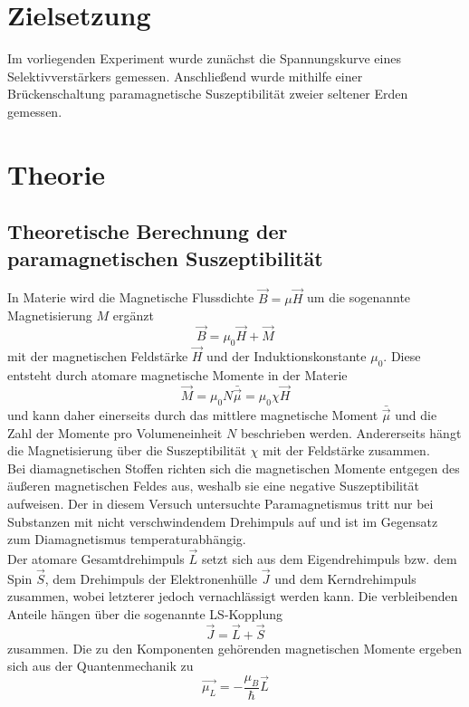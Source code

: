 \section{Zielsetzung}
Im vorliegenden Experiment wurde zunächst die Spannungskurve eines Selektivverstärkers gemessen. Anschließend wurde mithilfe einer Brückenschaltung paramagnetische Suszeptibilität zweier seltener Erden gemessen.
\section{Theorie}
\subsection{Theoretische Berechnung der paramagnetischen Suszeptibilität}
In Materie wird die Magnetische Flussdichte $\vec{B}=\mu \vec{H}$ um die sogenannte Magnetisierung $M$ ergänzt
\begin{equation*}
\vec{B}=\mu _0 \vec{H}+\vec{M}
\end{equation*}
mit der magnetischen Feldstärke $\vec{H}$ und der Induktionskonstante $\mu_0$. Diese entsteht durch atomare magnetische Momente in der Materie
\begin{equation}
\vec{M}=\mu_0N\bar{\vec{\mu}}=\mu_0\chi\vec{H}
\end{equation}
und kann daher einerseits durch das mittlere magnetische Moment $\bar{\vec{\mu}}$ und die Zahl der Momente pro Volumeneinheit $N$ beschrieben werden. Andererseits hängt die Magnetisierung über die Suszeptibilität $\chi$ mit der Feldstärke zusammen.\\ Bei diamagnetischen Stoffen richten sich die magnetischen Momente entgegen des äußeren magnetischen Feldes aus, weshalb sie eine negative Suszeptibilität aufweisen. Der in diesem Versuch untersuchte Paramagnetismus tritt nur bei Substanzen mit nicht verschwindendem Drehimpuls auf und ist im Gegensatz zum Diamagnetismus temperaturabhängig. \\
Der atomare Gesamtdrehimpuls $\vec{L}$ setzt sich aus dem Eigendrehimpuls bzw. dem Spin $\vec{S}$, dem Drehimpuls der Elektronenhülle $\vec{J}$ und dem Kerndrehimpuls zusammen, wobei letzterer jedoch vernachlässigt werden kann. Die verbleibenden Anteile hängen über die sogenannte LS-Kopplung
\begin{equation}
\vec{J}=\vec{L}+\vec{S}
\end{equation}
zusammen. Die zu den Komponenten gehörenden magnetischen Momente ergeben sich aus der Quantenmechanik zu
\begin{equation*}
\vec{\mu_L}=-\frac{\mu_B}{\hbar}\vec{L} 
\end{equation*}
